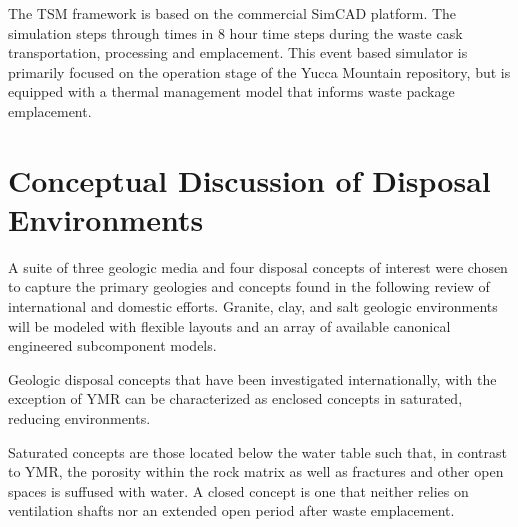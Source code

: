 The TSM framework is based on the commercial SimCAD platform. The simulation 
steps through times in 8 hour time steps during the waste cask transportation, 
processing and emplacement. This event based simulator is primarily focused on 
the operation stage of the Yucca Mountain repository, but is equipped with a 
thermal management model that informs waste package emplacement.

\section{Conceptual Discussion of Disposal Environments}





A suite of three geologic media and four disposal concepts of interest were
chosen to capture the primary geologies and concepts found in the following review 
of international and domestic efforts. Granite, clay, and salt geologic 
environments will be modeled with flexible layouts and an array of available 
canonical engineered subcomponent models.  

Geologic disposal concepts that have been investigated internationally, with the 
exception of \gls{YMR} can be characterized as enclosed concepts in saturated, 
reducing environments. 

Saturated concepts are those located below the water table such that, in contrast to 
\gls{YMR}, the porosity within the rock matrix as well as fractures 
and other open spaces is suffused with water. A closed concept is one that 
neither relies on ventilation shafts nor an extended open period after waste 
emplacement.

